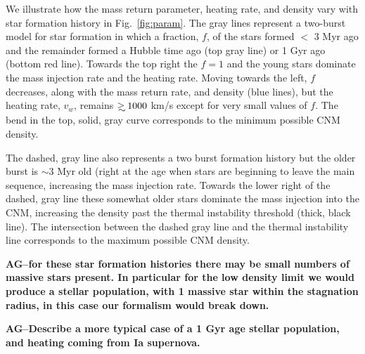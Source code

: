 \documentclass[usenatbib,fleqn]{mnras}
\newcommand\gsim{\mathrel{\rlap{\lower4pt\hbox{\hskip1pt$\sim$}}
    \raise1pt\hbox{$>$}}}
\begin{document}
We illustrate how the mass return parameter, heating rate, and
density vary with star formation history in Fig.~\ref{fig:param}. The
gray lines represent a two-burst model for star formation in which a
fraction, $f$, of the stars formed $<$ 3 Myr ago and the remainder
formed a Hubble time ago (top gray line) or 1 Gyr ago (bottom red
line).  Towards the top right the $f=1$ and the young stars dominate
the mass injection rate and the heating rate.  Moving towards the
left, $f$ decreases, along with the mass return rate, and density
(blue lines), but the heating rate, $v_w$, remains $\gsim 1000$ km/s
except for very small values of $f$. The bend in the top, solid, gray curve
corresponds to the minimum possible CNM density.

The dashed, gray line also represents a two burst formation history
but the older burst is $\sim 3$ Myr old (right at the age when stars
are beginning to leave the main sequence, increasing the mass
injection rate. Towards the lower right of the dashed, gray line these
somewhat older stars dominate the mass injection into the CNM,
increasing the density past the thermal instability threshold (thick,
black line). The intersection between the dashed gray line and the
thermal instability line corresponds to the maximum possible CNM
density.

{\bf AG--for these star formation histories there may be small numbers
of massive stars present. In particular for the low density limit we
would produce a stellar population, with 1 massive star within the
stagnation radius, in this case our formalism would break down.}

{\bf AG--Describe a more typical case of a 1 Gyr age stellar
  population, and heating coming from Ia supernova.}
\end{document}
